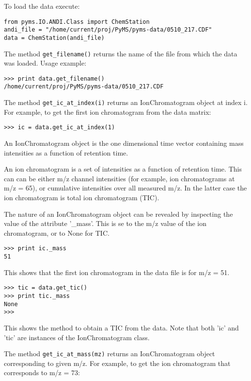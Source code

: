 To load the data execute:

\begin{verbatim}
from pyms.IO.ANDI.Class import ChemStation
andi_file = "/home/current/proj/PyMS/pyms-data/0510_217.CDF"
data = ChemStation(andi_file)
\end{verbatim}

The method {\tt get\_filename()} returns the name of the file from which
the data was loaded. Usage example:

\begin{verbatim}
>>> print data.get_filename()
/home/current/proj/PyMS/pyms-data/0510_217.CDF
\end{verbatim}

The method {\tt get\_ic\_at\_index(i)} returns an IonChromatogram object
at index i. For example, to get the first ion chromatogram from the data
matrix:

\begin{verbatim}
>>> ic = data.get_ic_at_index(1)
\end{verbatim}

\noindent
An IonChromatogram object is the one dimensional time vector containing
mass intensities as a function of retention time.

An ion chromatogram is a set of intensities as a function of retention
time. This can can be either m/z channel intensities (for example, ion
chromatograms at m/z = 65), or cumulative intensities over all measured
m/z. In the latter case the ion chromatogram is total ion chromatogram
(TIC).

The nature of an IonChromatogram object can be revealed by inspecting
the value of the attribute '\_mass'. This is se to the m/z value of
the ion chromatogram, or to None for TIC.

\begin{verbatim}
>>> print ic._mass
51
\end{verbatim}

\noindent
This shows that the first ion chromatogram in the data file is for
m/z = 51.

\begin{verbatim}
>>> tic = data.get_tic()
>>> print tic._mass
None
>>>
\end{verbatim}

\noindent
This shows the method to obtain a TIC from the data. Note that both
'ic' and 'tic' are instances of the IonChromatogram class.

The method {\tt get\_ic\_at\_mass(mz)} returns an IonChromatogram
object corresponding to given m/z. For example, to get the ion
chromatogram that corresponds to m/z = 73:

